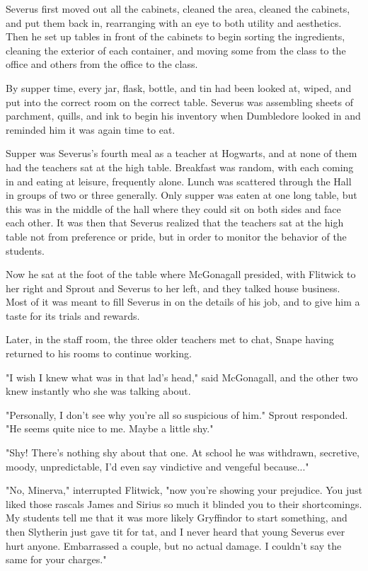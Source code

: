 \documentclass[a4paper,11pt]{article}
\begin{document}
Severus first moved out all the cabinets, cleaned the area, cleaned the cabinets, and put them back in, rearranging with an eye to both utility and aesthetics. Then he set up tables in front of the cabinets to begin sorting the ingredients, cleaning the exterior of each container, and moving some from the class to the office and others from the office to the class.

By supper time, every jar, flask, bottle, and tin had been looked at, wiped, and put into the correct room on the correct table. Severus was assembling sheets of parchment, quills, and ink to begin his inventory when Dumbledore looked in and reminded him it was again time to eat.

Supper was Severus's fourth meal as a teacher at Hogwarts, and at none of them had the teachers sat at the high table. Breakfast was random, with each coming in and eating at leisure, frequently alone. Lunch was scattered through the Hall in groups of two or three generally. Only supper was eaten at one long table, but this was in the middle of the hall where they could sit on both sides and face each other. It was then that Severus realized that the teachers sat at the high table not from preference or pride, but in order to monitor the behavior of the students.

Now he sat at the foot of the table where McGonagall presided, with Flitwick to her right and Sprout and Severus to her left, and they talked house business. Most of it was meant to fill Severus in on the details of his job, and to give him a taste for its trials and rewards.

Later, in the staff room, the three older teachers met to chat, Snape having returned to his rooms to continue working.

"I wish I knew what was in that lad's head," said McGonagall, and the other two knew instantly who she was talking about.

"Personally, I don't see why you're all so suspicious of him." Sprout responded. "He seems quite nice to me. Maybe a little shy."

"Shy! There's nothing shy about that one. At school he was withdrawn, secretive, moody, unpredictable, I'd even say vindictive and vengeful because..."

"No, Minerva," interrupted Flitwick, "now you're showing your prejudice. You just liked those rascals James and Sirius so much it blinded you to their shortcomings. My students tell me that it was more likely Gryffindor to start something, and then Slytherin just gave tit for tat, and I never heard that young Severus ever hurt anyone. Embarrassed a couple, but no actual damage. I couldn't say the same for your charges."
\end{document}

